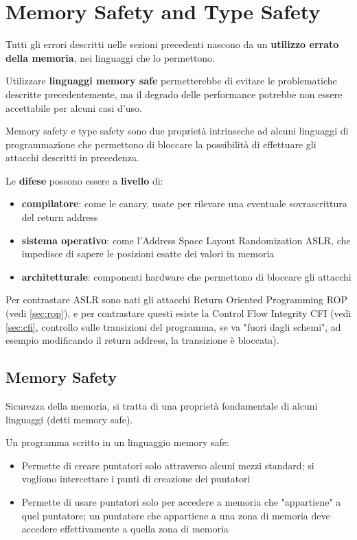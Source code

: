 
\section{Memory Safety and Type Safety}

Tutti gli errori descritti nelle sezioni precedenti nascono da un \textbf{utilizzo errato della memoria}, nei linguaggi che lo permettono. 

Utilizzare \textbf{linguaggi memory safe} permetterebbe di evitare le problematiche descritte precedentemente, ma il degrado delle performance potrebbe non essere accettabile per alcuni casi d'uso.

Memory safety e type safety sono due proprietà intrinseche ad alcuni linguaggi di programmazione che permettono di bloccare la possibilità di effettuare gli attacchi descritti in precedenza.

Le \textbf{difese} possono essere a \textbf{livello} di: 
\begin{itemize}
	\item \textbf{compilatore}: come le canary, usate per rilevare una eventuale sovrascrittura del return address

	\item \textbf{sistema operativo}: come l'Address Space Layout Randomization ASLR, che impedisce di sapere le posizioni esatte dei valori in memoria

	\item \textbf{architetturale}: componenti hardware che permettono di bloccare gli attacchi
\end{itemize}

Per contrastare ASLR sono nati gli attacchi Return Oriented Programming ROP (vedi \ref{sec:rop}), e per contrastare questi esiste la Control Flow Integrity CFI (vedi \ref{sec:cfi}, controllo sulle transizioni del programma, se va "fuori dagli schemi", ad esempio modificando il return address, la transizione è bloccata).

\subsection{Memory Safety}

Sicurezza della memoria, si tratta di una proprietà fondamentale di alcuni linguaggi (detti memory safe). 

Un programma scritto in un linguaggio memory safe:
\begin{itemize}
	\item Permette di creare puntatori solo attraverso alcuni mezzi standard; si vogliono intercettare i punti di creazione dei puntatori

	\item Permette di usare puntatori solo per accedere a memoria che "appartiene" a quel puntatore; un puntatore che appartiene a una zona di memoria deve accedere effettivamente a quella zona di memoria
\end{itemize}

